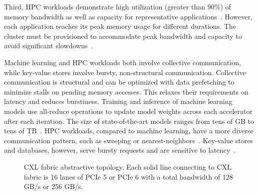 Third, HPC workloads demonstrate high utilization (greater than 90\%) of memory bandwidth as well as capacity for representative applications~\cite{doe-miniapps, crossroad-benchmarks, exascale-apps}.
%
However, each application reaches its peak memory usage for different durations.
%
The cluster must be provisioned to accommodate peak bandwidth and capacity to avoid significant slowdowns~\cite{hpc-memory-requirement:upc:2019, memory-trend:snl:2020, hpc-disagg-mem:arxiv:2023}.

Machine learning and HPC workloads both involve collective communication, while key-value stores involve bursty, non-structural communication.
%
Collective communication is structural and can be optimized with data prefetching to minimize stalls on pending memory accesses.
%
This relaxes their requirements on latency and reduces burstiness.
%
Training and inference of machine learning models use all-reduce operations to update model weights across each accelerator after each iteration. The size of state-of-the-art models ranges from tens of GB to tens of TB~\cite{zero:arxiv:2020, zero-infinity:sc:2021, zionex:isca:2022}.
%
HPC workloads, compared to machine learning, have a more diverse communication pattern, such as sweeping or nearest-neighbors~\cite{mpi-usage:sc:2019, ember-comm, exascale-apps, doe-miniapps}.
%
Key-value stores and databases, however, serve bursty requests and are sensitive to latency~\cite{scale-memcache:nsdi:2013, rocksdb-modeling:fast:2020}.

\begin{figure}[ht!]
    \begin{subfigure}[ht]{0.8\columnwidth}
    \end{subfigure}

    \begin{subfigure}[ht]{0.8\columnwidth}
    \end{subfigure}
\caption{CXL fabric abstractive topology. Each solid line connecting to CXL fabric is 16 lanes of PCIe 5 or PCIe 6 with a total bandwidth of 128 GB/s or 256 GB/s.}
\label{fig:cxl-topo}
\end{figure}

